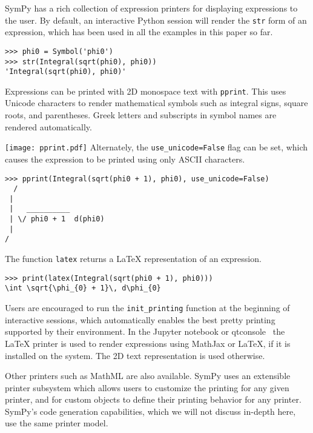 
SymPy has a rich collection of expression printers for displaying expressions
to the user. By default, an interactive Python session will render the
\verb|str| form of an expression, which has been used in all the examples in
this paper so far.

\begin{verbatim}
>>> phi0 = Symbol('phi0')
>>> str(Integral(sqrt(phi0), phi0))
'Integral(sqrt(phi0), phi0)'
\end{verbatim}

Expressions can be printed with 2D monospace text with \verb|pprint|. This
uses Unicode characters to render mathematical symbols such as integral signs,
square roots, and parentheses. Greek letters and subscripts in symbol names
are rendered automatically.

\noindent
\texttt{[image: pprint.pdf]}
Alternately, the \verb|use_unicode=False| flag can be set, which causes the
expression to be printed using only ASCII characters.

\begin{verbatim}
>>> pprint(Integral(sqrt(phi0 + 1), phi0), use_unicode=False)
  /
 |
 |   __________
 | \/ phi0 + 1  d(phi0)
 |
/
\end{verbatim}

The function \verb|latex| returns a \LaTeX{} representation of an expression.

\begin{verbatim}
>>> print(latex(Integral(sqrt(phi0 + 1), phi0)))
\int \sqrt{\phi_{0} + 1}\, d\phi_{0}
\end{verbatim}

Users are encouraged to run the \verb|init_printing| function at the beginning
of interactive sessions, which automatically enables the best pretty printing
supported by their environment. In the Jupyter notebook or
qtconsole~\cite{perez2007ipython} the \LaTeX{} printer is used to render
expressions using MathJax or \LaTeX{}, if it is installed on the system. The 2D
text representation is used otherwise.

Other printers such as MathML are also available. SymPy uses an extensible
printer subsystem which allows users to customize the printing for any given
printer, and for custom objects to define their printing behavior for any
printer. SymPy's code generation capabilities, which we will not discuss
in-depth here, use the same printer model.
